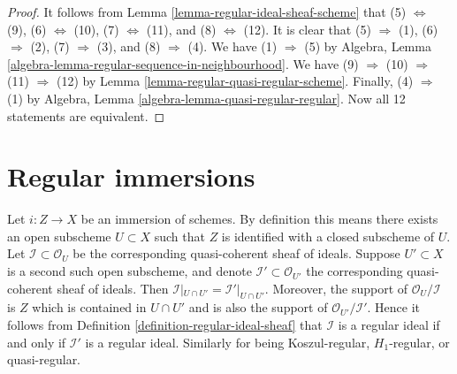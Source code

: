 \begin{proof}
It follows from
Lemma \ref{lemma-regular-ideal-sheaf-scheme}
that (5) $\Leftrightarrow$ (9), (6) $\Leftrightarrow$ (10),
(7) $\Leftrightarrow$ (11), and (8) $\Leftrightarrow$ (12).
It is clear that (5) $\Rightarrow$ (1), (6) $\Rightarrow$ (2),
(7) $\Rightarrow$ (3), and (8) $\Rightarrow$ (4).
We have (1) $\Rightarrow$ (5) by
Algebra, Lemma \ref{algebra-lemma-regular-sequence-in-neighbourhood}.
We have (9) $\Rightarrow$ (10) $\Rightarrow$ (11) $\Rightarrow$ (12) by
Lemma \ref{lemma-regular-quasi-regular-scheme}.
Finally, (4) $\Rightarrow$ (1) by
Algebra, Lemma \ref{algebra-lemma-quasi-regular-regular}.
Now all 12 statements are equivalent.
\end{proof}













\section{Regular immersions}
\label{section-regular-immersions}

\noindent
Let $i : Z \to X$ be an immersion of schemes. By definition this means
there exists an open subscheme $U \subset X$ such that
$Z$ is identified with a closed subscheme of $U$. Let
$\mathcal{I} \subset \mathcal{O}_U$ be the corresponding quasi-coherent
sheaf of ideals. Suppose $U' \subset X$ is a second such open
subscheme, and denote $\mathcal{I}' \subset \mathcal{O}_{U'}$
the corresponding quasi-coherent sheaf of ideals. Then
$\mathcal{I}|_{U \cap U'} = \mathcal{I}'|_{U \cap U'}$.
Moreover, the support of $\mathcal{O}_U/\mathcal{I}$
is $Z$ which is contained in $U \cap U'$ and is also the
support of $\mathcal{O}_{U'}/\mathcal{I}'$. Hence it follows from
Definition \ref{definition-regular-ideal-sheaf}
that $\mathcal{I}$ is a regular ideal if and only if
$\mathcal{I}'$ is a regular ideal. Similarly for being Koszul-regular,
$H_1$-regular, or quasi-regular.

